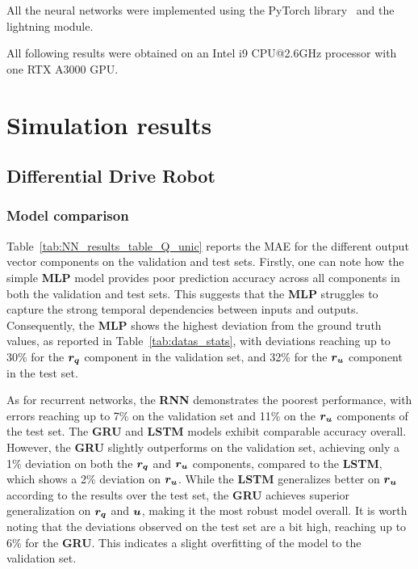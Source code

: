 All the neural networks were implemented using the PyTorch library~\cite{cPytorch} and the lightning module.

All following results were obtained on an Intel i9 CPU@2.6GHz processor with one RTX A3000 GPU. 

\section{Simulation results}\label{sec:nn_results}

\subsection{Differential Drive Robot}\label{sec:nn_results_unic}

\subsubsection{Model comparison}\label{sec:nn_comparaison_unic}

Table~\ref{tab:NN_results_table_Q_unic} reports the MAE for the different output vector components on the validation and test sets. 
Firstly, one can note how the simple \textbf{MLP} model provides poor prediction accuracy across all components in both the validation and test sets.
This suggests that the \textbf{MLP} struggles to capture the strong temporal dependencies between inputs and outputs.
Consequently, the \textbf{MLP} shows the highest deviation from the ground truth values, as reported in Table~\ref{tab:datas_stats}, with deviations reaching up to 30\% for the $\boldsymbol{r_q}$ component in the validation set, and 32\% for the $\boldsymbol{r_u}$ component in the test set.

As for recurrent networks, the \textbf{RNN} demonstrates the poorest performance, with errors reaching up to 7\% on the validation set and 11\% on the $\boldsymbol{r_u}$ components of the test set.
The \textbf{GRU} and \textbf{LSTM} models exhibit comparable accuracy overall. 
However, the \textbf{GRU} slightly outperforms on the validation set, achieving only a 1\% deviation on both the $\boldsymbol{r_q}$ and $\boldsymbol{r_u}$ components, compared to the \textbf{LSTM}, which shows a 2\% deviation on $\boldsymbol{r_u}$.
While the \textbf{LSTM} generalizes better on $\boldsymbol{r_u}$ according to the results over the test set, the \textbf{GRU} achieves superior generalization on $\boldsymbol{r_q}$ and $\boldsymbol{u}$, making it the most robust model overall.
It is worth noting that the deviations observed on the test set are a bit high, reaching up to 6\% for the \textbf{GRU}. 
This indicates a slight overfitting of the model to the validation set.

